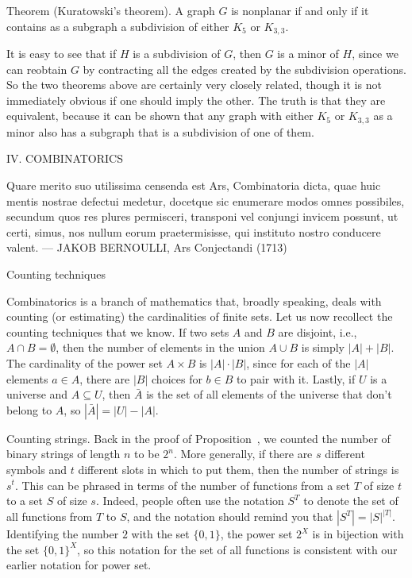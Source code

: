 \parenproclaim Theorem {\advthm} (Kuratowski's theorem). A graph $G$ is nonplanar if and only
if it contains as a subgraph a subdivision of either $K_5$ or $K_{3,3}$.\slug

It is easy to
see that if $H$ is a subdivision of $G$, then $G$ is a minor of $H$, since we can reobtain
$G$ by contracting all the edges created by the subdivision operations. So the two theorems
above are certainly very closely related, though it is not immediately obvious if one should imply
the other. The truth is that they are equivalent, because it can be shown that any graph with
either $K_5$ or $K_{3,3}$ as a minor also has a subgraph that is a subdivision of one of them.

\vfill\eject
\begingroup\headline{\hfil}\footline{\hfil}
\centerline{\titlefont IV. COMBINATORICS}
\vskip220pt
\bigskip
\begingroup\obeylines\eightssi
\hfill Quare merito suo utilissima censenda est Ars, {\eightss Combinatoria} dicta,
\hfill quae huic mentis nostrae defectui medetur,
\hfill docetque sic enumerare modos omnes possibiles,
\hfill secundum quos res plures permisceri, transponi vel conjungi invicem possunt,
\hfill ut certi, simus, nos nullum eorum praetermisisse,
\hfill qui instituto nostro conducere valent.
\eightss
\smallskip
\hfill --- JAKOB BERNOULLI, {\eightssi Ars Conjectandi} (1713)
\endgroup%
\bigskip\goodbreak
\vfill\eject

\advsect Counting techniques

Combinatorics is a branch of mathematics that, broadly speaking, deals with counting (or estimating)
the cardinalities of finite sets. Let us now recollect the counting techniques that we know.
If two sets $A$ and $B$ are disjoint, i.e., $A\cap B = \emptyset$,
then the number of elements in the union $A\cup B$ is simply $|A| + |B|$.
The cardinality of the power set $A\times B$ is $|A|\cdot |B|$, since for each of the $|A|$ elements
$a\in A$, there are $|B|$ choices for $b\in B$ to pair with it.
Lastly, if $U$ is a universe and $A\subseteq U$, then $\bar A$ is the set of all elements
of the universe that don't belong to $A$, so $|\bar A| = |U|-|A|$.

\medskip\boldlabel Counting strings.
Back in the proof of Proposition~{\propcardpowerset}, we counted the number of binary strings of
length $n$ to be $2^n$. More generally, if there are $s$ different symbols and $t$ different
slots in which to put them, then the number of strings is $s^t$. This can be phrased
in terms of the number of functions from a set $T$ of size $t$ to a set $S$ of size $s$.
Indeed, people often use the notation $S^T$ to denote the set of all functions from $T$ to $S$,
and the notation should remind you that $|S^T| = |S|^{|T|}$. Identifying the number
$2$ with the set $\{0,1\}$, the power set $2^X$ is in bijection with the set $\{0,1\}^X$, so
this notation for the set of all functions is consistent with our earlier notation for
power set.

